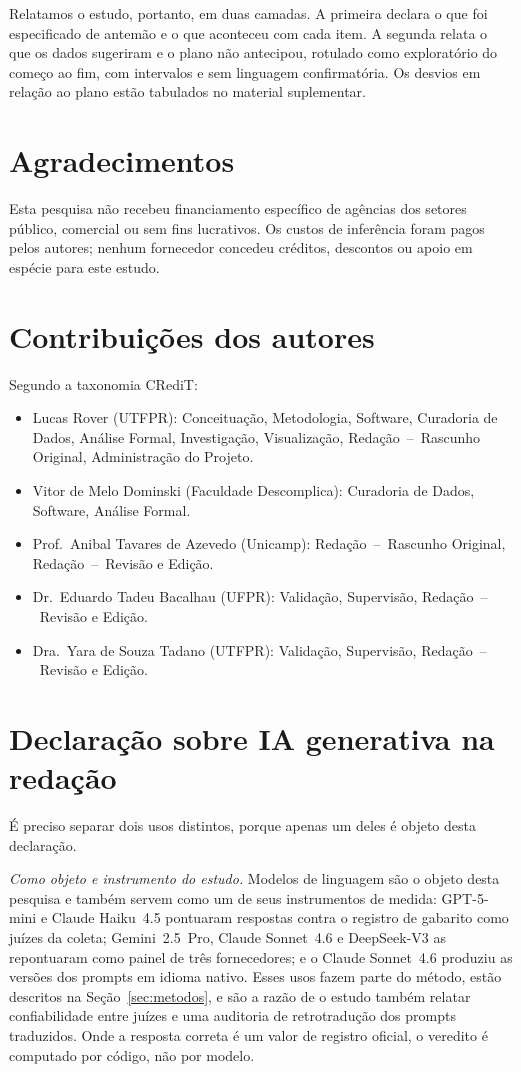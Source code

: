 \documentclass[11pt,a4paper]{article}
\begin{document}
Relatamos o estudo, portanto, em duas camadas. A primeira declara o que foi
especificado de antemão e o que aconteceu com cada item. A segunda relata o que
os dados sugeriram e o plano não antecipou, rotulado como exploratório do começo
ao fim, com intervalos e sem linguagem confirmatória. Os desvios em relação ao
plano estão tabulados no material suplementar.

\section*{Agradecimentos}

Esta pesquisa não recebeu financiamento específico de agências dos setores
público, comercial ou sem fins lucrativos. Os custos de inferência foram pagos
pelos autores; nenhum fornecedor concedeu créditos, descontos ou apoio em espécie
para este estudo.

\section*{Contribuições dos autores}

Segundo a taxonomia CRediT:
\begin{itemize}\setlength{\itemsep}{0pt}
\item Lucas Rover (UTFPR): Conceituação, Metodologia, Software, Curadoria
  de Dados, Análise Formal, Investigação, Visualização, Redação~--~Rascunho
  Original, Administração do Projeto.
\item Vitor de Melo Dominski (Faculdade Descomplica): Curadoria de Dados,
  Software, Análise Formal.
\item Prof.\ Anibal Tavares de Azevedo (Unicamp): Redação~--~Rascunho
  Original, Redação~--~Revisão e Edição.
\item Dr.\ Eduardo Tadeu Bacalhau (UFPR): Validação, Supervisão,
  Redação~--~Revisão e Edição.
\item Dra.\ Yara de Souza Tadano (UTFPR): Validação, Supervisão,
  Redação~--~Revisão e Edição.
\end{itemize}

\section*{Declaração sobre IA generativa na redação}

É preciso separar dois usos distintos, porque apenas um deles é objeto desta
declaração.

\emph{Como objeto e instrumento do estudo.} Modelos de linguagem são o objeto
desta pesquisa e também servem como um de seus instrumentos de medida: GPT-5-mini
e Claude Haiku~4.5 pontuaram respostas contra o registro de gabarito como juízes
da coleta; Gemini~2.5~Pro, Claude Sonnet~4.6 e DeepSeek-V3 as repontuaram como
painel de três fornecedores; e o Claude Sonnet~4.6 produziu as versões dos prompts
em idioma nativo. Esses usos fazem parte do método, estão descritos na
Seção~\ref{sec:metodos}, e são a razão de o estudo também relatar confiabilidade
entre juízes e uma auditoria de retrotradução dos prompts traduzidos. Onde a
resposta correta é um valor de registro oficial, o veredito é computado por
código, não por modelo.
\end{document}
